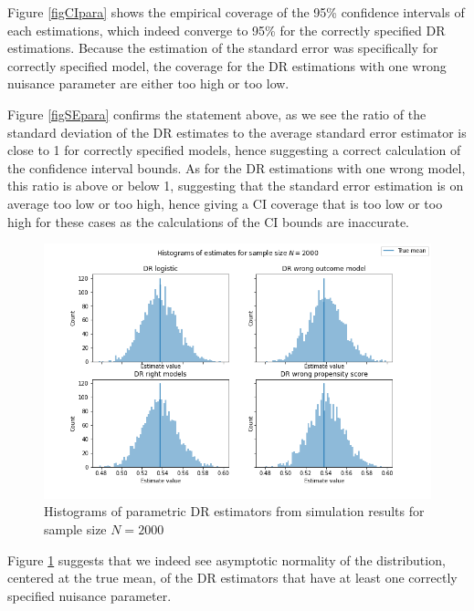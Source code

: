\documentclass[12pt,twoside]{article}
\begin{document}
Figure \ref{figCIpara} shows the empirical coverage of the 95\% confidence intervals of each estimations, which indeed converge to 95\% for the correctly specified DR estimations. Because the estimation of the standard error was specifically for correctly specified model, the coverage for the DR estimations with one wrong nuisance parameter are either too high or too low.

Figure \ref{figSEpara} confirms the statement above, as we see the ratio of the standard deviation of the DR estimates to the average standard error estimator is close to 1 for correctly specified models, hence suggesting a correct calculation of the confidence interval bounds. As for the DR estimations with one wrong model, this ratio is above or below 1, suggesting that the standard error estimation is on average too low or too high, hence giving a CI coverage that is too low or too high for these cases as the calculations of the CI bounds are inaccurate.

\begin{figure}[h!]
    \centering
    \includegraphics[width = 0.9\columnwidth]{figures/histpara.png}
    \caption{Histograms of parametric DR estimators from simulation results for sample size $N = 2000$}
    \label{fighistpara}
\end{figure}

Figure \ref{fighistpara} suggests that we indeed see asymptotic normality of the distribution, centered at the true mean, of the DR estimators that have at least one correctly specified nuisance parameter.\\
\end{document}
